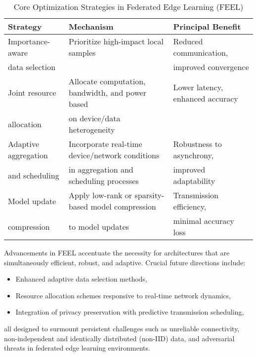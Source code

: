 \documentclass[11pt]{article}
\begin{document}
\begin{table}[htbp]
\centering
\caption{Core Optimization Strategies in Federated Edge Learning (FEEL)}
\label{tab:feel_strategies}
\begin{tabular}{|l|l|l|}
\hline
\textbf{Strategy}    & \textbf{Mechanism}                                       & \textbf{Principal Benefit}        \\
\hline
Importance-aware     & Prioritize high-impact local samples                     & Reduced communication,           \\
data selection       &                                                         & improved convergence             \\
\hline
Joint resource       & Allocate computation, bandwidth, and power based         & Lower latency, enhanced accuracy \\
allocation           & on device/data heterogeneity                            &                                  \\
\hline
Adaptive aggregation & Incorporate real-time device/network conditions          & Robustness to asynchrony,        \\
and scheduling       & in aggregation and scheduling processes                  & improved adaptability            \\
\hline
Model update         & Apply low-rank or sparsity-based model compression       & Transmission efficiency,         \\
compression          & to model updates                                        & minimal accuracy loss            \\
\hline
\end{tabular}
\end{table}

Advancements in FEEL accentuate the necessity for architectures that are simultaneously efficient, robust, and adaptive. Crucial future directions include:
\begin{itemize}
    \item Enhanced adaptive data selection methods,
    \item Resource allocation schemes responsive to real-time network dynamics,
    \item Integration of privacy preservation with predictive transmission scheduling,
\end{itemize}
all designed to surmount persistent challenges such as unreliable connectivity, non-independent and identically distributed (non-IID) data, and adversarial threats in federated edge learning environments.
\end{document}
